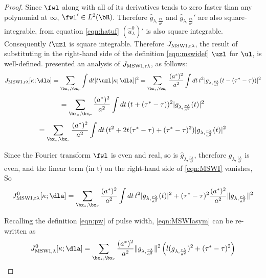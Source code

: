 \begin{proof}
Since $\fwl$ along with all of its derivatives
tends to zero faster than any polynomial at $\infty$, $\fwl' \in
L^2(\bR)$.
Therefore $\hat{g}_{\lambda,\frac{r\lambda}{a^2}}$
and $\hat{g}_{\lambda,\frac{r\lambda}{a^2}}'$ are also square-integrable, 
from equation \ref{eqn:hatuf} $(\hat{u}^0_{\lambda})'$ is also square
integrable. Consequently $t \uzl$ is square integrable. Therefore
$J_{\rm MSWI,r\lambda}$, the result of substituting in the
right-hand side of the definition \ref{eqn:mswidef} $\uzl$ for
$\ul$, is well-defined. \cite{HuangSymes2015SEG} presented an analysis of
$J_{\rm MSWI,r\lambda}$, as follows:
\[
J_{\rm MSWI,r\lambda}[\kappa;\dla] = \sum_{\bx_s,\bx_r}\int dt
|t\uzl[\kappa;\dla]|^2 =  \sum_{\bx_s,\bx_r}\frac{(a^*)^2}{a^2} \int dt\, t^2|g_{\lambda,\frac{r\lambda}{a^2}}(t-(\tau^*-\tau))|^2
\]
\[
=\sum_{\bx_s,\bx_r}\frac{(a^*)^2}{a^2} \int dt\, (t+(\tau^*-\tau))^2|g_{\lambda,\frac{r\lambda}{a^2}}(t)|^2
\]
\begin{equation}
  \label{eqn:MSWI}
  =\sum_{\bx_s,\bx_r}\frac{(a^*)^2}{a^2} \int dt\, (t^2 + 2t
  (\tau^*-\tau)+(\tau^*-\tau)^2)|g_{\lambda,\frac{r\lambda}{a^2}}(t)|^2
\end{equation}

Since the Fourier transform $\fwl$ is even and real, so is
$\hat{g}_{\lambda,\frac{r\lambda}{a^2}}$, therefore $g_{\lambda,\frac{r\lambda}{a^2}}$ is even, and the linear term (in t) on the
right-hand side of \ref{eqn:MSWI} vanishes, So
\begin{equation}
  \label{eqn:MSWIasym}
  J^0_{\rm MSWI,r\lambda}[\kappa;\dla] =
\sum_{\bx_s,\bx_r}\frac{(a^*)^2}{a^2} \int dt\, t^2|g_{\lambda,\frac{r\lambda}{a^2}}(t)|^2
+(\tau^*-\tau)^2\frac{(a^*)^2}{a^2}\|g_{\lambda,\frac{r\lambda}{a^2}}\|^2
\end{equation}

Recalling the definition \ref{eqn:pw} of pulse width, \ref{eqn:MSWIasym} can be re-written as
\begin{equation}
  \label{eqn:MSWIasym2}
  J^0_{\rm MSWI,\lambda}[\kappa;\dla] = 
  \sum_{\bx_s,\bx_r}\frac{(a^*)^2}{a^2}\|g_{\lambda,\frac{r\lambda}{a^2}}\|^2\left(l(g_{\lambda,\frac{r\lambda}{a^2}})^2  + (\tau^*-\tau)^2\right)
\end{equation}



\end{proof}
